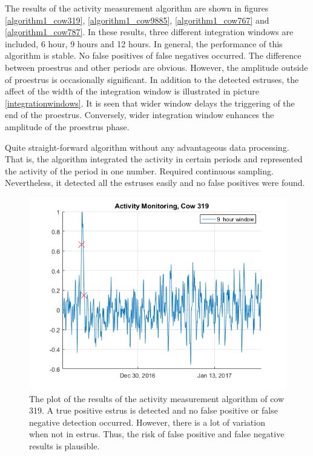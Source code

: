 \documentclass[english,12pt,a4paper,pdftex,elec,utf8]{aaltothesis}
\begin{document}
The results of the activity measurement algorithm are shown in figures \ref{algorithm1_cow319}, \ref{algorithm1_cow9885}, \ref{algorithm1_cow767} and \ref{algorithm1_cow787}. In these results, three different integration windows are included, 6 hour, 9 hours and 12 hours. In general, the performance of this algorithm is stable. No false positives of false negatives occurred. The difference between proestrus and other periods are obvious. However, the amplitude outside of proestrus is occasionally significant. In addition to the detected estruses, the affect of the width of the integration window is illustrated in picture \ref{integrationwindows}. It is seen that wider window delays the triggering of the end of the proestrus. Conversely, wider integration window enhances the amplitude of the proestrus phase. 



Quite straight-forward algorithm without any advantageous data processing. That is, the algorithm integrated the activity in certain periods and represented the activity of the period in one number. Required continuous sampling. Nevertheless, it detected all the estruses easily and no false positives were found. \\

\begin{figure}[htb]
\centering
\includegraphics[width = 0.75 \textwidth]{figures/ActivityMonitoringCow319.png}
\caption{The plot of the results of the activity measurement algorithm of cow 319. A true positive estrus is detected and no false positive or false negative detection occurred. However, there is a lot of variation when not in estrus. Thus, the risk of false positive and false negative results is plausible.}
\label{ActivityMonitoringCow319}
\end{figure}
\end{document}

